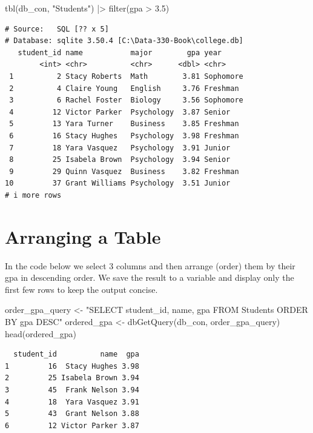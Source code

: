 \documentclass[
  letterpaper,
  DIV=11,
  numbers=noendperiod]{scrreprt}
\newenvironment{Shaded}{\begin{snugshade}}{\end{snugshade}}
\newcommand{\FloatTok}[1]{\textcolor[rgb]{0.68,0.00,0.00}{#1}}
\newcommand{\FunctionTok}[1]{\textcolor[rgb]{0.28,0.35,0.67}{#1}}
\newcommand{\NormalTok}[1]{\textcolor[rgb]{0.00,0.23,0.31}{#1}}
\newcommand{\OtherTok}[1]{\textcolor[rgb]{0.00,0.23,0.31}{#1}}
\newcommand{\SpecialCharTok}[1]{\textcolor[rgb]{0.37,0.37,0.37}{#1}}
\newcommand{\StringTok}[1]{\textcolor[rgb]{0.13,0.47,0.30}{#1}}
\begin{document}
\begin{Shaded}
\begin{Highlighting}[]
\FunctionTok{tbl}\NormalTok{(db\_con, }\StringTok{"Students"}\NormalTok{) }\SpecialCharTok{|\textgreater{}} \FunctionTok{filter}\NormalTok{(gpa }\SpecialCharTok{\textgreater{}} \FloatTok{3.5}\NormalTok{)}
\end{Highlighting}
\end{Shaded}

\begin{verbatim}
# Source:   SQL [?? x 5]
# Database: sqlite 3.50.4 [C:\Data-330-Book\college.db]
   student_id name           major        gpa year     
        <int> <chr>          <chr>      <dbl> <chr>    
 1          2 Stacy Roberts  Math        3.81 Sophomore
 2          4 Claire Young   English     3.76 Freshman 
 3          6 Rachel Foster  Biology     3.56 Sophomore
 4         12 Victor Parker  Psychology  3.87 Senior   
 5         13 Yara Turner    Business    3.85 Freshman 
 6         16 Stacy Hughes   Psychology  3.98 Freshman 
 7         18 Yara Vasquez   Psychology  3.91 Junior   
 8         25 Isabela Brown  Psychology  3.94 Senior   
 9         29 Quinn Vasquez  Business    3.82 Freshman 
10         37 Grant Williams Psychology  3.51 Junior   
# i more rows
\end{verbatim}

\section{Arranging a Table}\label{arranging-a-table}

In the code below we select 3 columns and then arrange (order) them by
their gpa in descending order. We save the result to a variable and
display only the first few rows to keep the output concise.

\begin{Shaded}
\begin{Highlighting}[]
\NormalTok{order\_gpa\_query }\OtherTok{\textless{}{-}} \StringTok{"SELECT student\_id, name, gpa FROM Students ORDER BY gpa DESC"}
\NormalTok{ordered\_gpa }\OtherTok{\textless{}{-}} \FunctionTok{dbGetQuery}\NormalTok{(db\_con, order\_gpa\_query)}
\FunctionTok{head}\NormalTok{(ordered\_gpa)}
\end{Highlighting}
\end{Shaded}

\begin{verbatim}
  student_id          name  gpa
1         16  Stacy Hughes 3.98
2         25 Isabela Brown 3.94
3         45  Frank Nelson 3.94
4         18  Yara Vasquez 3.91
5         43  Grant Nelson 3.88
6         12 Victor Parker 3.87
\end{verbatim}
\end{document}
